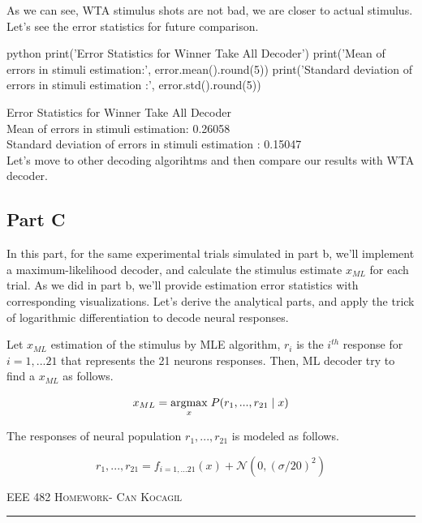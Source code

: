 \documentclass[12pt]{amsart}
\begin{document}
As we can see, WTA stimulus shots are not bad, we are closer to actual stimulus. Let's see the error statistics for future comparison.

\begin{mintedbox}{python}
print('Error Statistics for Winner Take All Decoder')
print('Mean of errors in stimuli estimation:', error.mean().round(5))
print('Standard deviation of errors in stimuli estimation :', error.std().round(5))
\end{mintedbox}

Error Statistics for Winner Take All Decoder \\
Mean of errors in stimuli estimation: 0.26058\\
Standard deviation of errors in stimuli estimation : 0.15047\\

Let's move to other decoding algorihtms and then compare our results with WTA decoder.


\subsection{Part C}
In this part, for the same experimental trials simulated in part b, we'll implement a maximum-likelihood decoder, and calculate the stimulus estimate $x_{ML}$ for each trial. As we did in part b, we'll provide estimation error statistics with corresponding visualizations. Let's derive the analytical parts, and apply the trick of logarithmic differentiation to decode neural responses.

\bigskip
Let $x_{ML}$ estimation of the stimulus by MLE algorithm, $r_i$ is the $i^{th}$ response for $i = 1,...21$ that represents the 21 neurons responses. Then, ML decoder try to find a $x_{ML}$ as follows.

\begin{equation}
x_{ML} =  \underset{x}{\mathrm{argmax}} \hspace{1mm} P(r_1,...,r_{21}\mid x)
\end{equation}


The responses of neural population $r_1,...,r_{21}$ is modeled as follows.



\begin{equation}
    r_1,...,r_{21} =  f_{i = 1,...21} (x) + \mathcal{N}(0,(\sigma / 20)^2)
\end{equation}


\newpage
{\scshape EEE 482} \hfill {\scshape \large  Homework-\relax} \hfill {\scshape Can Kocagil}
\smallskip
\hrule
\vspace{2mm}
\end{document}
